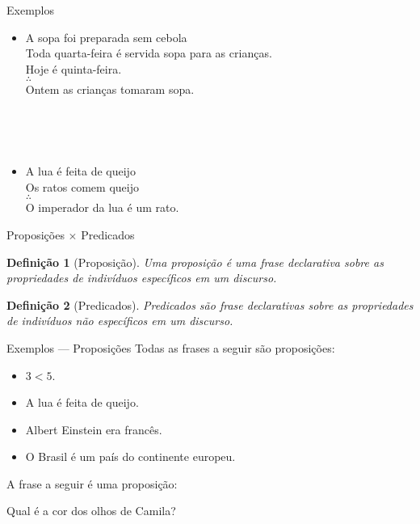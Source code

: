 \documentclass[aspectratio=169]{beamer}
\newtheorem{defi}{Definição}
\begin{document}
	\begin{frame}{Exemplos}
		\begin{itemize}
			\item[a.] 
			\begin{flushleft}
				A sopa foi preparada  sem cebola\\ 
				Toda quarta-feira é servida sopa para as crianças.\\
				Hoje é quinta-feira.\\
				$\therefore$\\
				Ontem as crianças tomaram sopa.
			\end{flushleft}
			\pause
			
			\
			
			\
			\item[b.] 
			\begin{flushleft}
				A lua é feita de queijo\\
				Os ratos comem queijo\\ 
				$\therefore$\\
				O imperador da lua é um rato.
			\end{flushleft}
		\end{itemize}
	\end{frame}

	\begin{frame}{Proposições $\times$ Predicados}
		\begin{defi}[Proposição]\label{def:Proposicao}
			Uma proposição é uma frase declarativa sobre as propriedades de indivíduos específicos em um discurso.
		\end{defi}
		\pause
		\begin{defi}[Predicados]\label{def:Predicados}
			Predicados são frase declarativas sobre as propriedades de indivíduos não específicos em um discurso.
		\end{defi}
	\end{frame}

	\begin{frame}{Exemplos --- Proposições}
		Todas as frases a seguir são proposições:
		\begin{itemize}
			\item[(a)] $3 < 5$.
			\item[(b)] A lua é feita de queijo.
			\item[(c)] Albert Einstein era francês.
			\item[(d)] O Brasil é um país do continente europeu.
		\end{itemize}
		\pause		
		\begin{alertblock}{A frase a seguir é uma proposição: }
			\
			
			Qual é a cor dos olhos de Camila?
		\end{alertblock}
	\end{frame}
\end{document}
